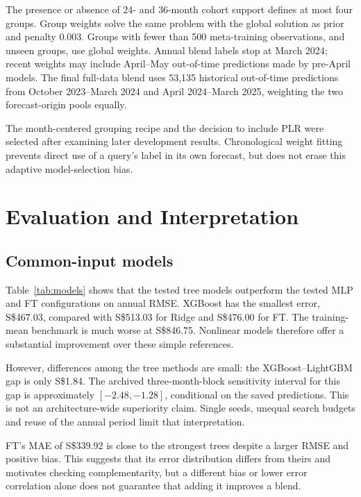 \documentclass[conference]{IEEEtran}
\newcommand{\sgd}{S\$}
\begin{document}
The presence or absence of 24- and 36-month cohort support defines at most four groups. Group weights solve the same problem with the global solution as prior and penalty 0.003. Groups with fewer than 500 meta-training observations, and unseen groups, use global weights. Annual blend labels stop at March 2024; recent weights may include April--May out-of-time predictions made by pre-April models. The final full-data blend uses 53,135 historical out-of-time predictions from October 2023--March 2024 and April 2024--March 2025, weighting the two forecast-origin pools equally.

The month-centered grouping recipe and the decision to include PLR were selected after examining later development results. Chronological weight fitting prevents direct use of a query's label in its own forecast, but does not erase this adaptive model-selection bias.

\section{Evaluation and Interpretation}
\subsection{Common-input models}
\begin{table}[t]
\caption{Common 27 inputs; 35,158 annual validation rows. All errors are in SGD. Bias is prediction minus actual rent.}
\label{tab:models}
\centering\small

\end{table}

Table~\ref{tab:models} shows that the tested tree models outperform the tested MLP and FT configurations on annual RMSE. XGBoost has the smallest error, \sgd467.03, compared with \sgd513.03 for Ridge and \sgd476.00 for FT. The training-mean benchmark is much worse at \sgd846.75. Nonlinear models therefore offer a substantial improvement over these simple references.

However, differences among the tree methods are small: the XGBoost--LightGBM gap is only \sgd1.84. The archived three-month-block sensitivity interval for this gap is approximately $[-2.48,-1.28]$, conditional on the saved predictions. This is not an architecture-wide superiority claim. Single seeds, unequal search budgets and reuse of the annual period limit that interpretation.

FT's MAE of \sgd339.92 is close to the strongest trees despite a larger RMSE and positive bias. This suggests that its error distribution differs from theirs and motivates checking complementarity, but a different bias or lower error correlation alone does not guarantee that adding it improves a blend.
\end{document}
